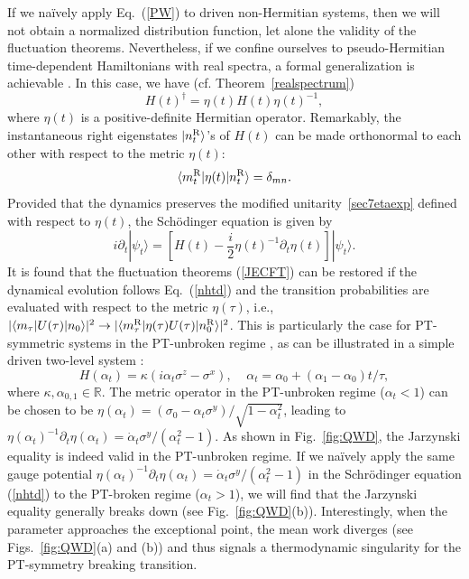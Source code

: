 \documentclass{tADP2e}
\theoremstyle{plain}
\theoremstyle{plain}
\theoremstyle{definition}
\begin{document}
If we na\"ively apply Eq.~(\ref{PW}) to driven non-Hermitian systems, then we will not obtain a normalized distribution function, let alone the validity of the fluctuation theorems. Nevertheless, if we confine ourselves to pseudo-Hermitian time-dependent Hamiltonians with real spectra, a formal generalization is achievable \cite{SD16}. In this case, we have (cf. Theorem~\ref{realspectrum})
\begin{equation}
H(t)^\dag =\eta(t) H(t) \eta(t)^{-1},
\end{equation}   
where $\eta(t)$ is a positive-definite Hermitian operator. Remarkably, the instantaneous right eigenstates $|n_t^{\rm R}\rangle$'s of $H(t)$ can be made orthonormal to each other with respect to the metric $\eta(t)$:
\begin{equation}\label{sec7etaexp}
\langle m_t^{\rm R}|\eta(t)|n_t^{\rm R}\rangle=\delta_{mn}.
\end{equation}
Provided that the dynamics preserves the modified unitarity~\eqref{sec7etaexp} defined with respect to $\eta(t)$, the Sch\"odinger equation is given by \cite{JG13}
\begin{equation}
i\partial_t|\psi_t\rangle=\left[H(t)-\frac{i}{2}\eta(t)^{-1}\partial_t\eta(t)\right]|\psi_t\rangle.
\label{nhtd}
\end{equation}
It is found that the fluctuation theorems (\ref{JECFT}) can be restored if the dynamical evolution follows Eq.~(\ref{nhtd}) and the transition probabilities are evaluated with respect to the metric $\eta(\tau)$, i.e., $|\langle m_\tau |U(\tau)|n_0\rangle|^2\to|\langle m^{\rm R}_\tau |\eta(\tau)U(\tau)|n^{\rm R}_0\rangle|^2$. This is particularly the case for PT-symmetric systems in the PT-unbroken regime \cite{DSSA15,WBB18}, as can be illustrated in a simple driven two-level system \cite{DSSA15}:
\begin{equation}
H(\alpha_t)=\kappa(i\alpha_t\sigma^z-\sigma^x),\;\;\;\;\alpha_t=\alpha_0+(\alpha_1-\alpha_0)t/\tau,
\label{Halpha}
\end{equation}
where $\kappa,\alpha_{0,1}\in\mathbb{R}$. The metric operator in the PT-unbroken regime ($\alpha_t<1$) can be chosen to be $\eta(\alpha_t)=(\sigma_0 - \alpha_t \sigma^y)/\sqrt{1-\alpha_t^2}$, leading to $\eta(\alpha_t)^{-1}\partial_t\eta(\alpha_t)=\dot{\alpha}_t\sigma^y/(\alpha_t^2-1)$. As shown in Fig.~\ref{fig:QWD}, the Jarzynski equality is indeed valid in the PT-unbroken regime. If we na\"ively apply the same gauge potential $\eta(\alpha_t)^{-1}\partial_t\eta(\alpha_t)=\dot{\alpha}_t\sigma^y/(\alpha_t^2-1)$ in the Schr\"odinger equation (\ref{nhtd}) to the PT-broken regime ($\alpha_t>1$), we will find that the Jarzynski equality generally breaks down (see Fig.~\ref{fig:QWD}(b)). Interestingly, when the parameter approaches the exceptional point, the mean work diverges (see Figs.~\ref{fig:QWD}(a) and (b)) and thus signals a thermodynamic singularity for the PT-symmetry breaking transition. 
\end{document}

